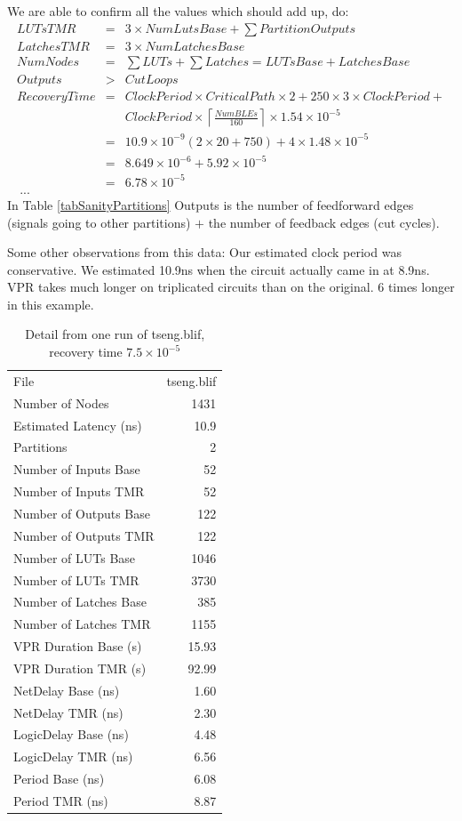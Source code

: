 \documentclass[12pt,final,oneside]{dwThesis} %
\begin{document}
   We are able to confirm all the values which should add up, do:
   \begin{eqnarray*}
   	LUTsTMR &=& 3\times NumLutsBase + \sum PartitionOutputs\\
   	LatchesTMR &=&  3\times NumLatchesBase\\
   	NumNodes &=& \sum LUTs+\sum Latches = LUTsBase+LatchesBase\\
   	Outputs &>& CutLoops\\
   	RecoveryTime &=& ClockPeriod\times CriticalPath\times 2 + 250\times3\times ClockPeriod + \\
   	& &ClockPeriod\times \left\lceil \frac{NumBLEs}{160}\right\rceil\times 1.54\times10^{-5}\\
   	&=& 10.9\times10^{-9}(2\times20+750)+4\times1.48\times10^{-5}\\
   	&=& 8.649\times10^{-6}+5.92\times10^{-5}\\
   	&=& 6.78\times10^{-5}\\\
   	...
   \end{eqnarray*}
   In Table \ref{tabSanityPartitions} Outputs is the number of feedforward edges (signals going to other partitions) $+$ the number of feedback edges (cut cycles).
   
   Some other observations from this data: Our estimated clock period was conservative. We estimated 10.9ns when the circuit actually came in at 8.9ns.
   \ac{VPR} takes much longer on triplicated circuits than on the original. 6 times longer in this example.
      \begin{table}
   	\begin{tabular}{lr}
   	\toprule
File & tseng.blif\\
Number of Nodes & 1431\\
Estimated Latency (ns)& 10.9\\
Partitions & 2\\
Number of Inputs Base & 52\\
Number of Inputs TMR & 52\\
Number of Outputs Base & 122\\
Number of Outputs TMR & 122\\
Number of LUTs Base & 1046\\
Number of LUTs TMR & 3730\\
Number of Latches Base & 385\\
Number of Latches TMR & 1155\\
VPR Duration Base (s) & 15.93\\
VPR Duration TMR (s) & 92.99\\
NetDelay Base (ns) & 1.60\\
NetDelay TMR (ns) & 2.30\\
LogicDelay Base (ns) & 4.48\\
LogicDelay TMR (ns) & 6.56\\
Period Base (ns) & 6.08\\
Period TMR (ns) & 8.87\\
\bottomrule
   	\end{tabular}
   	\caption{Detail from one run of tseng.blif, recovery time $7.5\times10^{-5}$}\label{tabSanity}
   \end{table}
   
\end{document}
